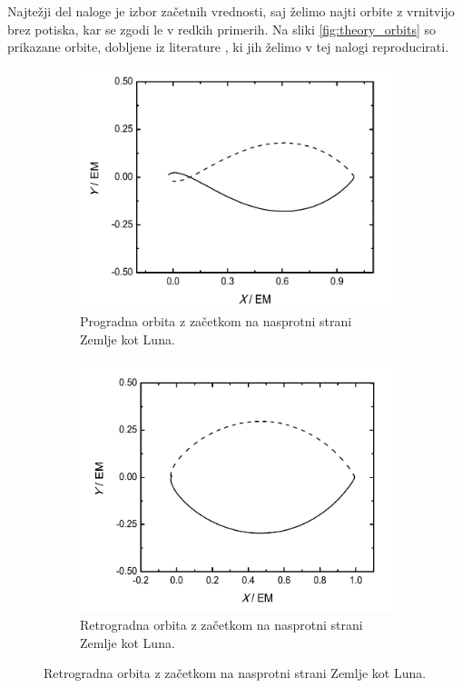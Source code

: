 \documentclass[11pt, titlepage]{article}
\begin{document}
Najtežji del naloge je izbor začetnih vrednosti, saj želimo najti orbite z vrnitvijo brez potiska, kar se zgodi le v redkih primerih.
Na sliki \ref{fig:theory_orbits} so prikazane orbite, dobljene iz literature \cite{XIYUN2013183}, ki jih želimo v tej nalogi reproducirati.
\begin{figure}[h]
    \centering
    \begin{subfigure}[b]{0.45\textwidth}
        \centering
        \includegraphics[width=\textwidth]{figures/theory_orbit_1.png}
        \caption{Progradna orbita z začetkom na nasprotni strani Zemlje kot Luna.}
        \label{fig:orbit_1}
    \end{subfigure}
    \hfill
    \begin{subfigure}[b]{0.45\textwidth}
        \centering
        \includegraphics[width=\textwidth]{figures/theory_orbit_2.png}
        \caption{Retrogradna orbita z začetkom na nasprotni strani Zemlje kot Luna.}
        \label{fig:orbit_2}
    \end{subfigure}


\end{figure}
\end{document}
